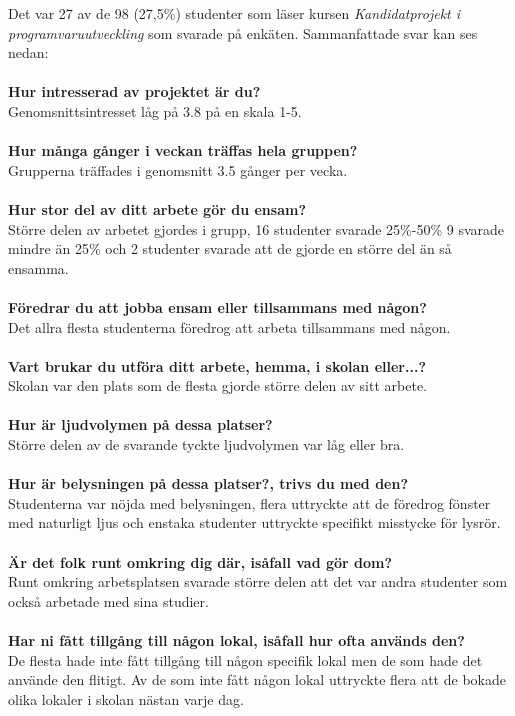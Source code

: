 Det var 27 av de 98 (27,5\%) studenter som läser kursen \textit{Kandidatprojekt i programvaruutveckling} som svarade på enkäten. Sammanfattade svar kan ses nedan:\\
\\\textbf{Hur intresserad av projektet är du?}\\ 
Genomsnittsintresset låg på 3.8 på en skala 1-5.\\\\
\textbf{Hur många gånger i veckan träffas hela gruppen?}\\
Grupperna träffades i genomsnitt 3.5 gånger per vecka.\\\\
\textbf{Hur stor del av ditt arbete gör du ensam?}\\
Större delen av arbetet gjordes i grupp, 16 studenter svarade 25\%-50\% 9 svarade  mindre än 25\% och 2 studenter svarade att de gjorde en större del än så ensamma.\\\\
\textbf{Föredrar du att jobba ensam eller tillsammans med någon?}\\
Det allra flesta studenterna föredrog att arbeta tillsammans med någon.\\\\
\textbf{Vart brukar du utföra ditt arbete, hemma, i skolan eller...?}\\
Skolan var den plats som de flesta gjorde större delen av sitt arbete. \\\\
\textbf{Hur är ljudvolymen på dessa platser?}\\
Större delen av de svarande tyckte ljudvolymen var låg eller bra.\\\\
\textbf{Hur är belysningen på dessa platser?, trivs du med den?}\\
Studenterna var nöjda med belysningen, flera uttryckte att de föredrog fönster med naturligt ljus och enstaka studenter uttryckte specifikt misstycke för lysrör.\\\\
\textbf{Är det folk runt omkring dig där, isåfall vad gör dom?}\\
Runt omkring arbetsplatsen svarade större delen att det var andra studenter som också arbetade med sina studier.\\\\
\textbf{Har ni fått tillgång till någon lokal, isåfall hur ofta används den?}\\
De flesta hade inte fått tillgång till någon specifik lokal men de som hade det använde den flitigt. Av de som inte fått någon lokal uttryckte flera att de bokade olika lokaler i skolan nästan varje dag.\\\\
